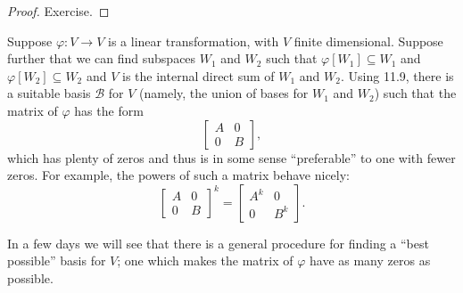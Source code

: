 \documentclass{memoir}
\begin{document}
\begin{proof}
Exercise.
\end{proof}

Suppose $\varphi : V \rightarrow V$ is a linear transformation, with $V$ finite dimensional. Suppose further that we can find subspaces $W_1$ and $W_2$ such that $\varphi[W_1] \subseteq W_1$ and $\varphi[W_2] \subseteq W_2$ and $V$ is the internal direct sum of $W_1$ and $W_2$. Using 11.9, there is a suitable basis $\mathcal{B}$ for $V$ (namely, the union of bases for $W_1$ and $W_2$) such that the matrix of $\varphi$ has the form \[ \left[ \begin{array}{c|c} A & 0 \\ \hline 0 & B \end{array} \right], \] which has plenty of zeros and thus is in some sense ``preferable'' to one with fewer zeros. For example, the powers of such a matrix behave nicely: \[ \left[ \begin{array}{c|c} A & 0 \\ \hline 0 & B \end{array} \right]^k = \left[ \begin{array}{c|c} A^k & 0 \\ \hline 0 & B^k \end{array} \right]. \]

In a few days we will see that there is a general procedure for finding a ``best possible'' basis for $V$; one which makes the matrix of $\varphi$ have as many zeros as possible.
\end{document}
